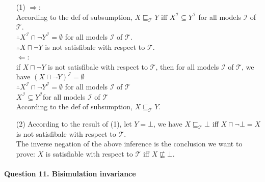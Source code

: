 \documentclass[12pt]{article}
\begin{document}
    \begin{enumerate}
        \item[(1)]
        $\Longrightarrow$:\\
        According to the def of subsumption, $X \sqsubseteq _{\mathcal{T}} Y$ iff $X^{\mathcal{I}} \subseteq Y^{\mathcal{I}}$ for all models $\mathcal{I}$ of $\mathcal{T}$. \\
        $\therefore  X^{\mathcal{I}} \cap \lnot Y^{\mathcal{I}} = \emptyset$ for all models $\mathcal{I}$ of $\mathcal{T}$. \\
        $\therefore X \sqcap \lnot Y$ is not satisfibale with respect to $\mathcal{T}$. \\
        $\Longleftarrow$:\\
        if $X \sqcap \lnot Y$ is not satisfibale with respect to $\mathcal{T}$, then for all models $\mathcal{I}$ of $\mathcal{T}$, we have $(X \sqcap \lnot Y)^{\mathcal{I}} = \emptyset$ \\
        $\therefore X^{\mathcal{I}} \cap \lnot Y^{\mathcal{I}} = \emptyset$ for all models $\mathcal{I}$ of $\mathcal{T}$ \\
        $X^{\mathcal{I}} \subseteq Y^{\mathcal{I}}$for all models $\mathcal{I}$ of $\mathcal{T}$ \\
        According to the def of subsumption, $X \sqsubseteq _{\mathcal{T}} Y$.
    \item[(2)]
        According to the result of (1), let $Y = \bot$, we have $X \sqsubseteq _{\mathcal{T}}\bot$ iff $X \sqcap \lnot \bot = X$ is not satisfibale with respect to $\mathcal{T}$. \\
        The inverse negation of the above inference is the conclusion we want to prove: $X$ is satisfiable with respect to $\mathcal{T}$ iff $X \not \sqsubseteq \bot$. \\

    \end{enumerate}

    \paragraph{Question 11. Bisimulation invariance}~{}
    \\
\end{document}
